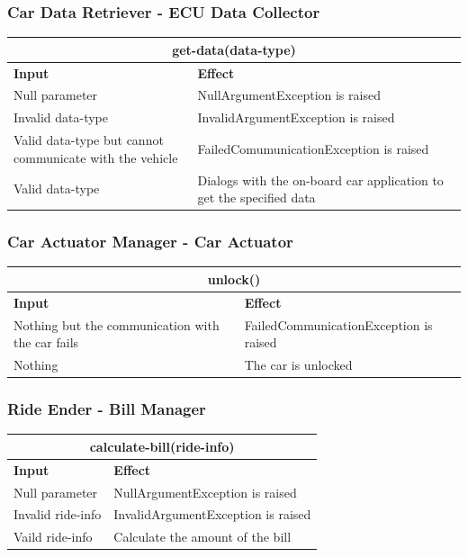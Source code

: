 \documentclass{article}
\begin{document}
\subsubsection{Car Data Retriever - ECU Data Collector}
\begin{tabular}{ |p{5cm}|p{7cm}| }
  \hline
  \multicolumn{2}{|c|}{get-data(data-type)} \\
  \hline
  \textbf{Input} & \textbf{Effect} \\
  \hline
  Null parameter & NullArgumentException is raised\\
  \hline
  Invalid data-type & InvalidArgumentException is raised\\
  \hline
  Valid data-type but cannot communicate with the vehicle & FailedComumunicationException is raised\\
  \hline
   Valid data-type & Dialogs with the on-board car application to get the specified data\\
  \hline
\end{tabular}
\subsubsection{Car Actuator Manager - Car Actuator}
\begin{tabular}{ |p{5cm}|p{7cm}| }
  \hline
  \multicolumn{2}{|c|}{unlock()} \\
  \hline
  \textbf{Input} & \textbf{Effect} \\
  \hline
  Nothing but the communication with the car fails & FailedCommunicationException is raised\\
  \hline
  Nothing & The car is unlocked \\
  \hline
\end{tabular}
\subsubsection{Ride Ender - Bill Manager}
\begin{tabular}{ |p{5cm}|p{7cm}| }
  \hline
  \multicolumn{2}{|c|}{calculate-bill(ride-info)} \\
  \hline
  \textbf{Input} & \textbf{Effect} \\
  \hline
  Null parameter & NullArgumentException is raised\\
  \hline
  Invalid ride-info & InvalidArgumentException is raised \\
  \hline
  Vaild ride-info & Calculate the amount of the bill\\
  \hline
\end{tabular}
\end{document}
